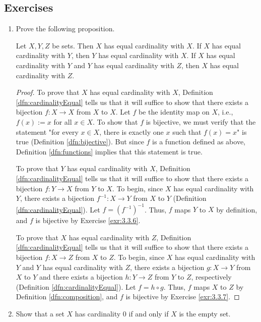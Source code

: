 \documentclass[../main.tex]{subfiles}
\begin{document}
\subsection*{Exercises}
\begin{enumerate}[ref={\thesection.\arabic*}]
    \item \label{exr:3.6.1}Prove the following proposition.
    \begin{prp}
        Let $X,Y,Z$ be sets. Then $X$ has equal cardinality with $X$. If $X$ has equal cardinality with $Y$, then $Y$ has equal cardinality with $X$. If $X$ has equal cardinality with $Y$ and $Y$ has equal cardinality with $Z$, then $X$ has equal cardinality with $Z$.
        \begin{proof}
            To prove that $X$ has equal cardinality with $X$, Definition \ref{dfn:cardinalityEqual} tells us that it will suffice to show that there exists a bijection $f:X\to X$ from $X$ to $X$. Let $f$ be the identity map on $X$, i.e., $f(x):=x$ for all $x\in X$. To show that $f$ is bijective, we must verify that the statement "for every $x\in X$, there is exactly one $x$ such that $f(x)=x$" is true (Definition \ref{dfn:bijective}). But since $f$ is a function defined as above, Definition \ref{dfn:functions} implies that this statement is true.\par
            To prove that $Y$ has equal cardinality with $X$, Definition \ref{dfn:cardinalityEqual} tells us that it will suffice to show that there exists a bijection $f:Y\to X$ from $Y$ to $X$. To begin, since $X$ has equal cardinality with $Y$, there exists a bijection $f^{-1}:X\to Y$ from $X$ to $Y$ (Definition \ref{dfn:cardinalityEqual}). Let $f=(f^{-1})^{-1}$. Thus, $f$ maps $Y$ to $X$ by definition, and $f$ is bijective by Exercise \ref{exr:3.3.6}.\par
            To prove that $X$ has equal cardinality with $Z$, Definition \ref{dfn:cardinalityEqual} tells us that it will suffice to show that there exists a bijection $f:X\to Z$ from $X$ to $Z$. To begin, since $X$ has equal cardinality with $Y$ and $Y$ has equal cardinality with $Z$, there exists a bijection $g:X\to Y$ from $X$ to $Y$ and there exists a bijection $h:Y\to Z$ from $Y$ to $Z$, respectively (Definition \ref{dfn:cardinalityEqual}). Let $f=h\circ g$. Thus, $f$ maps $X$ to $Z$ by Definition \ref{dfn:composition}, and $f$ is bijective by Exercise \ref{exr:3.3.7}.
        \end{proof}
    \end{prp}
    \item \label{exr:3.6.2}Show that a set $X$ has cardinality 0 if and only if $X$ is the empty set.

\end{enumerate}
\end{document}
